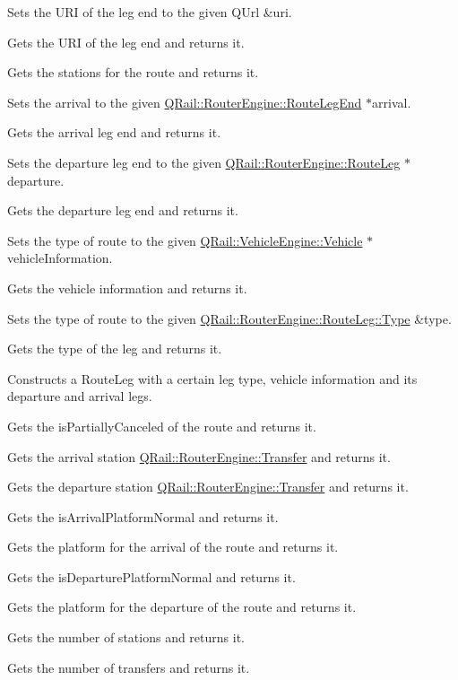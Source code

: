Sets the U\+RI of the leg end to the given Q\+Url \&uri.

Gets the U\+RI of the leg end and returns it.

Gets the stations for the route and returns it.

Sets the arrival to the given \mbox{\hyperlink{classQRail_1_1RouterEngine_1_1RouteLegEnd}{Q\+Rail\+::\+Router\+Engine\+::\+Route\+Leg\+End}} $\ast$arrival.

Gets the arrival leg end and returns it.

Sets the departure leg end to the given \mbox{\hyperlink{classQRail_1_1RouterEngine_1_1RouteLeg}{Q\+Rail\+::\+Router\+Engine\+::\+Route\+Leg}} $\ast$departure.

Gets the departure leg end and returns it.

Sets the type of route to the given \mbox{\hyperlink{classQRail_1_1VehicleEngine_1_1Vehicle}{Q\+Rail\+::\+Vehicle\+Engine\+::\+Vehicle}} $\ast$vehicle\+Information.

Gets the vehicle information and returns it.

Sets the type of route to the given \mbox{\hyperlink{classQRail_1_1RouterEngine_1_1RouteLeg_af31dfcc23f2ae80f7fb0feca24cb9816}{Q\+Rail\+::\+Router\+Engine\+::\+Route\+Leg\+::\+Type}} \&type.

Gets the type of the leg and returns it.

Constructs a Route\+Leg with a certain leg type, vehicle information and it\textquotesingle{}s departure and arrival legs.

Gets the is\+Partially\+Canceled of the route and returns it.

Gets the arrival station \mbox{\hyperlink{classQRail_1_1RouterEngine_1_1Transfer}{Q\+Rail\+::\+Router\+Engine\+::\+Transfer}} and returns it.

Gets the departure station \mbox{\hyperlink{classQRail_1_1RouterEngine_1_1Transfer}{Q\+Rail\+::\+Router\+Engine\+::\+Transfer}} and returns it.

Gets the is\+Arrival\+Platform\+Normal and returns it.

Gets the platform for the arrival of the route and returns it.

Gets the is\+Departure\+Platform\+Normal and returns it.

Gets the platform for the departure of the route and returns it.

Gets the number of stations and returns it.

Gets the number of transfers and returns it.

